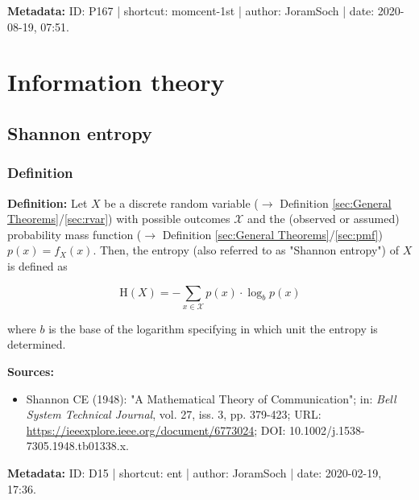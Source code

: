 \documentclass[a4paper,12pt,twoside]{book}
\begin{document}
\vspace{1em}
\textbf{Metadata:} ID: P167 | shortcut: momcent-1st | author: JoramSoch | date: 2020-08-19, 07:51.
\vspace{1em}



\pagebreak
\section{Information theory}

\subsection{Shannon entropy}

\subsubsection[\textit{Definition}]{Definition} \label{sec:ent}
\setcounter{equation}{0}

\textbf{Definition:} Let $X$ be a discrete random variable ($\rightarrow$ Definition \ref{sec:General Theorems}/\ref{sec:rvar}) with possible outcomes $\mathcal{X}$ and the (observed or assumed) probability mass function ($\rightarrow$ Definition \ref{sec:General Theorems}/\ref{sec:pmf}) $p(x) = f_X(x)$. Then, the entropy (also referred to as "Shannon entropy") of $X$ is defined as

\begin{equation} \label{eq:ent-ent}
\mathrm{H}(X) = - \sum_{x \in \mathcal{X}} p(x) \cdot \log_b p(x)
\end{equation}

where $b$ is the base of the logarithm specifying in which unit the entropy is determined.


\vspace{1em}
\textbf{Sources:}
\begin{itemize}
\item Shannon CE (1948): "A Mathematical Theory of Communication"; in: \textit{Bell System Technical Journal}, vol. 27, iss. 3, pp. 379-423; URL: \url{https://ieeexplore.ieee.org/document/6773024}; DOI: 10.1002/j.1538-7305.1948.tb01338.x.
\end{itemize}


\vspace{1em}
\textbf{Metadata:} ID: D15 | shortcut: ent | author: JoramSoch | date: 2020-02-19, 17:36.
\vspace{1em}
\end{document}
